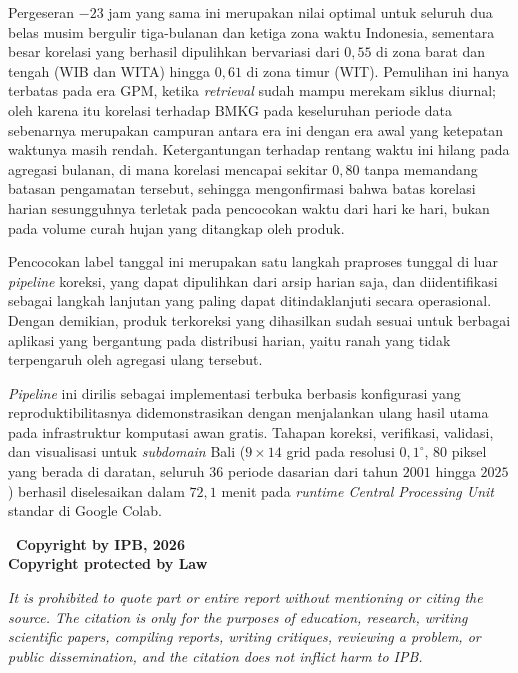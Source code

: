 Pergeseran $-23$ jam yang sama ini merupakan nilai optimal
untuk seluruh dua belas musim bergulir tiga-bulanan dan ketiga zona waktu Indonesia,
sementara besar korelasi yang berhasil dipulihkan bervariasi dari $0{,}55$ di
zona barat dan tengah (WIB dan WITA) hingga $0{,}61$ di zona timur (WIT). Pemulihan ini
hanya terbatas pada era GPM, ketika \emph{retrieval} sudah mampu merekam
siklus diurnal; oleh karena itu korelasi terhadap BMKG pada keseluruhan periode data
sebenarnya merupakan campuran antara era ini dengan era awal yang ketepatan
waktunya masih rendah. Ketergantungan terhadap rentang waktu ini hilang pada
agregasi bulanan, di mana korelasi mencapai sekitar $0{,}80$ tanpa memandang
batasan pengamatan tersebut, sehingga mengonfirmasi bahwa batas korelasi harian
sesungguhnya terletak pada pencocokan waktu dari hari ke hari, bukan pada
volume curah hujan yang ditangkap oleh produk.

Pencocokan label tanggal
ini merupakan satu langkah praproses tunggal di luar \emph{pipeline} koreksi,
yang dapat dipulihkan dari arsip harian saja, dan diidentifikasi sebagai langkah
lanjutan yang paling dapat ditindaklanjuti secara operasional. Dengan demikian,
produk terkoreksi yang dihasilkan sudah sesuai untuk berbagai aplikasi yang
bergantung pada distribusi harian, yaitu ranah yang tidak terpengaruh oleh
agregasi ulang tersebut.

\emph{Pipeline} ini dirilis sebagai implementasi terbuka berbasis 
konfigurasi yang reproduktibilitasnya didemonstrasikan dengan menjalankan
ulang hasil utama pada infrastruktur komputasi awan gratis. Tahapan koreksi,
verifikasi, validasi, dan visualisasi untuk
\emph{subdomain} Bali ($9 \times 14$ grid pada resolusi $0{,}1^{\circ}$, $80$
piksel yang berada di daratan, seluruh $36$ periode dasarian dari tahun $2001$ hingga $2025$)
berhasil diselesaikan dalam $72{,}1$ menit pada \emph{runtime Central Processing Unit}
standar di Google Colab.

\medskip
{}
\clearpage

\thispagestyle{empty}
\vspace*{\fill}
\begin{center}
{\fontsize{14}{18}\selectfont\bfseries
\textcopyright\ Copyright by IPB, 2026\\
Copyright protected by Law\par}
\end{center}
\vspace{\baselineskip}
\noindent\textit{It is prohibited to quote part or entire report without 
mentioning or citing the source. The citation is only for the purposes 
of education, research, writing scientific papers, compiling reports, 
writing critiques, reviewing a problem, or public dissemination, and 
the citation does not inflict harm to IPB.}
\vspace*{2cm}
\clearpage

